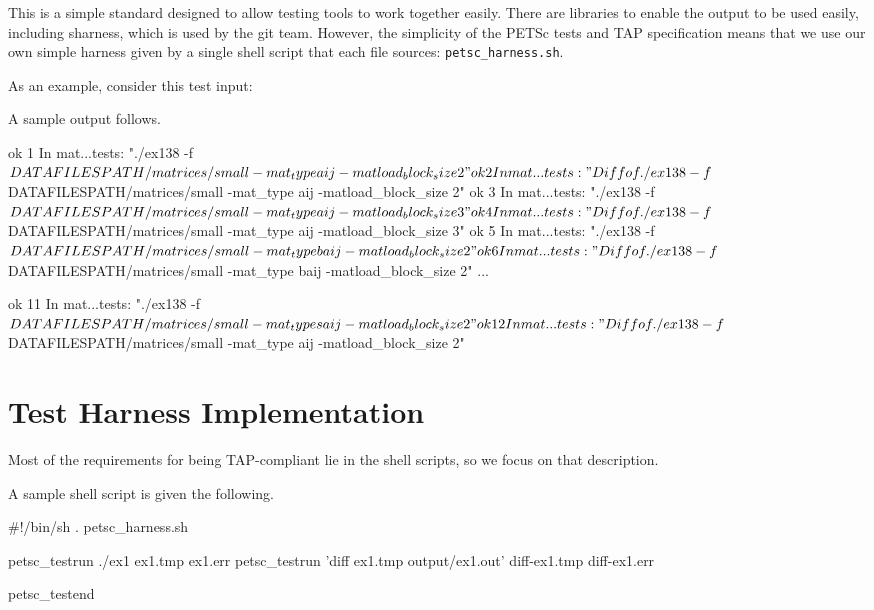 This is a  simple standard designed to allow testing tools to work
together easily.  There are libraries to enable the output to be used
easily, including sharness, which is used by the git team.  However, the
simplicity of the PETSc tests and TAP specification means that we use
our own simple harness given by a single shell script that each file
sources: \lstinline{petsc_harness.sh}.

As an example, consider this test input:
%

A sample output follows.
\begin{outputlisting}[\scriptsize\ttfamily]
ok 1 In mat...tests: "./ex138 -f ${DATAFILESPATH}/matrices/small -mat_type aij -matload_block_size 2"
ok 2 In mat...tests: "Diff of ./ex138 -f ${DATAFILESPATH}/matrices/small -mat_type aij -matload_block_size 2"
ok 3 In mat...tests: "./ex138 -f ${DATAFILESPATH}/matrices/small -mat_type aij -matload_block_size 3"
ok 4 In mat...tests: "Diff of ./ex138 -f ${DATAFILESPATH}/matrices/small -mat_type aij -matload_block_size 3"
ok 5 In mat...tests: "./ex138 -f ${DATAFILESPATH}/matrices/small -mat_type baij -matload_block_size 2"
ok 6 In mat...tests: "Diff of ./ex138 -f ${DATAFILESPATH}/matrices/small -mat_type baij -matload_block_size 2"
...

ok 11 In mat...tests: "./ex138 -f ${DATAFILESPATH}/matrices/small -mat_type saij -matload_block_size 2"
ok 12 In mat...tests: "Diff of ./ex138 -f ${DATAFILESPATH}/matrices/small -mat_type aij -matload_block_size 2"
\end{outputlisting}

\section{Test Harness Implementation%
  \label{test-harness-implementation}%
}

Most of the requirements for being TAP-compliant lie in the shell
scripts, so we focus on that description.

A sample shell script is given the following.
\begin{bashlisting}
#!/bin/sh
. petsc_harness.sh

petsc_testrun ./ex1 ex1.tmp ex1.err
petsc_testrun 'diff ex1.tmp output/ex1.out' diff-ex1.tmp diff-ex1.err

petsc_testend
\end{bashlisting}

